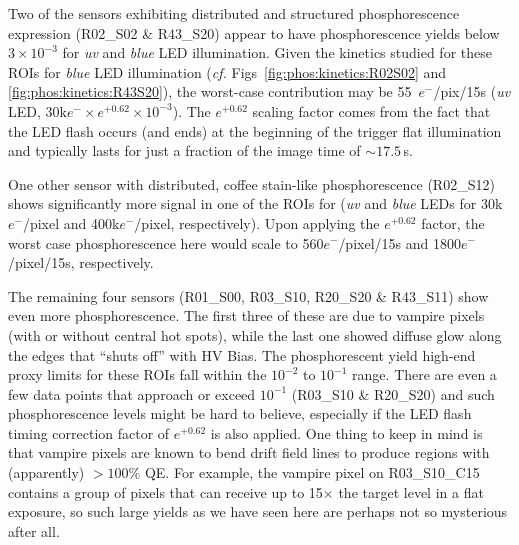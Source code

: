 Two of the sensors exhibiting distributed and structured phosphorescence expression (R02\_S02 \& R43\_S20) appear to have phosphorescence yields below $3\times 10^{-3}$ for {\it uv} and {\it blue} LED illumination. Given the kinetics studied for these ROIs for {\it blue} LED illumination ({\it cf.} Figs~\ref{fig:phos:kinetics:R02S02} and \ref{fig:phos:kinetics:R43S20}), the worst-case contribution may be 55~$e^-$/pix/15s ({\it uv} LED, $30{\mathrm k}e^{-} \times e^{+0.62} \times 10^{-3}$). The $e^{+0.62}$ scaling factor comes from the fact that the LED flash occurs (and ends) at the beginning of the trigger flat illumination and typically lasts for just a fraction of the image time of $\sim17.5$\,s.

One other sensor with distributed, coffee stain-like phosphorescence (R02\_S12) shows significantly more signal in one of the ROIs for ({\it uv} and {\it blue} LEDs for 30k$e^-$/pixel and 400k$e^-$/pixel, respectively). Upon applying the $e^{+0.62}$ factor, the worst case phosphorescence here would scale to 560$e^-$/pixel/15s and 1800$e^-$/pixel/15s, respectively.

The remaining four sensors (R01\_S00, R03\_S10, R20\_S20 \& R43\_S11) show even more phosphorescence. The first three of these are due to vampire pixels (with or without central hot spots), while the last one showed diffuse glow along the edges that ``shuts off'' with HV Bias. The phosphorescent yield high-end proxy limits for these ROIs fall within the $10^{-2}$ to $10^{-1}$ range. There are even a few data points that approach or exceed $10^{-1}$ (R03\_S10 \& R20\_S20) and such phosphorescence levels might be hard to believe, especially if the LED flash timing correction factor of $e^{+0.62}$ is also applied. One thing to keep in mind is that vampire pixels are known to bend drift field lines to produce regions with (apparently) $>100\%$ QE. For example, the vampire pixel on R03\_S10\_C15 contains a group of pixels that can receive up to 15$\times$ the target level in a flat exposure, so such large yields as we have seen here are perhaps not so mysterious after all.

